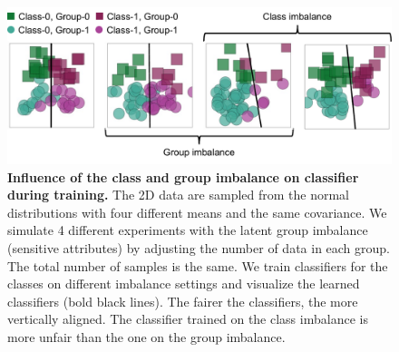 \begin{figure}[t]
    \centering
    \includegraphics[width=1.0\linewidth]{figures/fairness_toy_exp_2.pdf}
    \caption{\textbf{Influence of the class and group imbalance on classifier during training.} 
    The 2D data are sampled from the normal distributions with four different means and the same covariance. 
    We simulate 4 different experiments with the latent group imbalance (sensitive attributes) by adjusting the number of data in each group.
    The total number of samples is the same.
    We train classifiers for the classes on different imbalance settings and visualize the learned classifiers (bold black lines).
    The fairer the classifiers, the more vertically aligned.
    The classifier trained on the class imbalance is more unfair than the one on the group imbalance.
    }
    \label{fig:fair_toy}
\end{figure}



